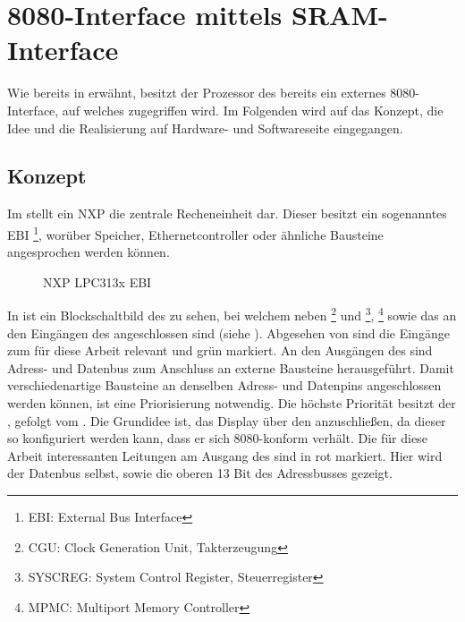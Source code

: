 \section{8080-Interface mittels SRAM-Interface}
\label{sec:TeilA_8080SRAM}
Wie bereits in  erwähnt, besitzt der Prozessor des  bereits ein externes 8080-Interface, auf welches zugegriffen wird. Im Folgenden wird auf das Konzept, die Idee und die Realisierung auf Hardware- und Softwareseite eingegangen.
\newpage
\subsection{Konzept}
\label{cha:teila_konzept}
Im  stellt ein NXP  die zentrale Recheneinheit dar. Dieser besitzt ein sogenanntes EBI \footnote{EBI: External Bus Interface}, worüber Speicher, Ethernetcontroller oder ähnliche Bausteine angesprochen werden können.

\begin{figure}[htp]
	\centering
{}
	\caption{NXP LPC313x EBI}
	\label{fig:lpc_ebi}
\end{figure}

In  ist ein Blockschaltbild des  zu sehen, bei welchem neben \footnote{CGU: Clock Generation Unit, Takterzeugung} und \footnote{SYSCREG: System Control Register, Steuerregister}, \footnote{MPMC: Multiport Memory Controller} sowie das  an den Eingängen des  angeschlossen sind (siehe \cite{NXP2010}). Abgesehen von  sind die Eingänge zum  für diese Arbeit relevant und grün markiert. An den Ausgängen des  sind Adress- und Datenbus zum Anschluss an externe Bausteine herausgeführt. Damit verschiedenartige Bausteine an denselben Adress- und Datenpins angeschlossen werden können, ist eine Priorisierung notwendig. Die höchste Priorität besitzt der , gefolgt vom . 
Die Grundidee ist, das Display über den  anzuschließen, da dieser so konfiguriert werden kann, dass er sich 8080-konform verhält. Die für diese Arbeit interessanten Leitungen am Ausgang des  sind in  rot markiert. Hier wird der Datenbus selbst, sowie die oberen 13 Bit des Adressbusses gezeigt.


